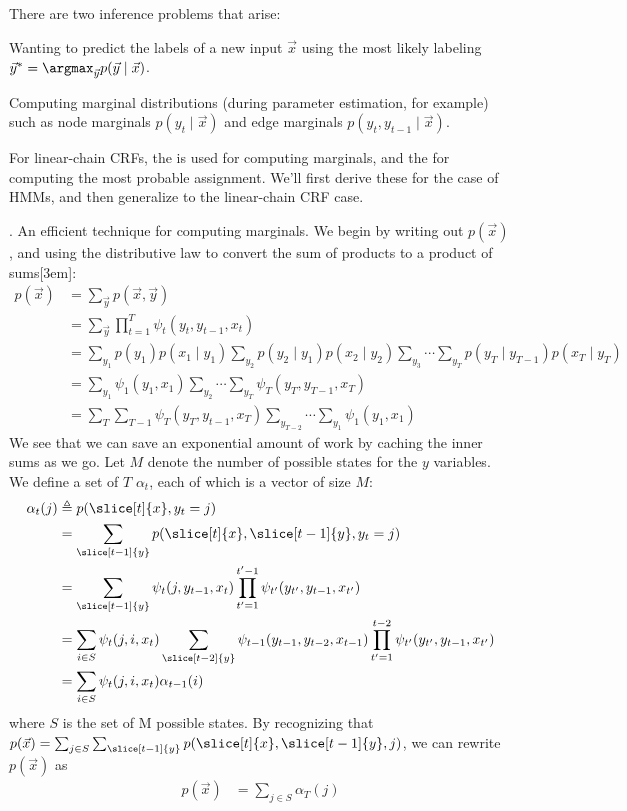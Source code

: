 \documentclass[11pt]{article}
\begin{document}
\p There are two inference problems that arise:
\begin{compactenum}
	\item Wanting to predict the labels of a new input $\vec{x}$ using the most likely labeling $\vec{y}^* = \argmax_{\vec y} p(\vec{y} \mid \vec{x})$. 
	
	\item Computing marginal distributions (during parameter estimation, for example) such as node marginals $p(y_t \mid \vec x)$ and edge marginals $p(y_t, y_{t -1} \mid \vec x)$. 
\end{compactenum}
For linear-chain CRFs, the  is used for computing marginals, and the  for computing the most probable assignment. We'll first derive these for the case of HMMs, and then generalize to the linear-chain CRF case. 

\myspace
\p {}. An efficient technique for computing marginals. We begin by writing out $p(\vec x)$, and using the distributive law to convert the sum of products to a product of sums[3em]:
\begin{align}
p(\vec x) &= \sum_{\vec y} p(\vec x, \vec y) \\
&= \sum_{\vec y} \prod_{t = 1}^{T} \psi_t(y_t, y_{t - 1}, x_t) \\
&= \sum_{y_1} p(y_1)p(x_1 \mid y_1) \sum_{y_2} p(y_2 \mid y_1) p(x_2 \mid y_2) \sum_{y_3} \cdots \sum_{y_T} p(y_T \mid y_{T-1}) p(x_T \mid y_{T}) \\
&= \sum_{y_1} \psi_1(y_1, x_1) \sum_{y_2} \cdots \sum_{y_T} \psi_T(y_T, y_{T - 1}, x_T) \\
&= \sum_T \sum_{T - 1} \psi_T(y_T, y_{t - 1}, x_T) \sum_{y_{T - 2}} \cdots \sum_{y_1} \psi_1(y_1, x_1) \label{crf-4-3}
\end{align}
We see that we can save an exponential amount of work by caching the inner sums as we go. Let $M$ denote the number of possible states for the $y$ variables. We define a set of $T$  $\alpha_t$, each of which is a vector of size $M$:
\begin{align}
\alpha_t(j) &\triangleq p(\slice[t]{x}, y_t = j) \label{alpha-1} \\
&= \sum_{\slice[t-1]{y}} p(\slice[t]{x}, \slice[t-1]{y}, y_t = j) \label{alpha-2} \\
&= \sum_{\slice[t-1]{y}} \psi_t(j, y_{t - 1}, x_t) \prod_{t' = 1}^{t' - 1} \psi_{t'}(y_{t'}, y_{t - 1}, x_{t'}) \\
&= \sum_{i \in S} \psi_t(j, i, x_t) \sum_{\slice[t-2]{y}} \psi_{t-1}(y_{t -1}, y_{t -2}, x_{t -1}) \prod_{t' = 1}^{t - 2} \psi_{t'}(y_{t'}, y_{t - 1}, x_{t'}) \\
&= \sum_{i \in S} \psi_t(j, i, x_t) \alpha_{t - 1}(i)
\end{align}
where $S$ is the set of M possible states. By recognizing that $p(\vec x) = \sum_{j \in S}\sum_{\slice[t-1]{y}} p(\slice[t]{x}, \slice[t-1]{y}, j)$, we can rewrite $p(\vec x)$ as
\begin{align}
p(\vec x) &= \sum_{j \in S} \alpha_T(j) \label{alpha-3}
\end{align}
\end{document}

